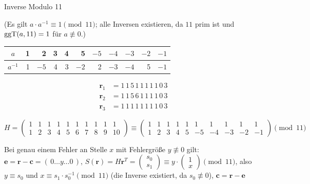 \begin{loesung}
Inverse Modulo 11
\begin{center}
(Es gilt $a \cdot a^{-1} \equiv 1 \pmod{11}$; alle Inversen existieren, da $11$ prim ist und $\operatorname{ggT}(a, 11) = 1$ für $a \not\equiv 0$.)
\begin{tabular}{c|rrrrrrrrrr}
$a$      & 1 & 2  & 3 & 4 & 5  & $-5$ & $-4$ & $-3$ & $-2$ & $-1$\\
\midrule
$a^{-1}$ & 1 & $-5$ & 4 & 3 & $-2$ & 2 & $-3$ & $-4$ & 5 & $-1$\\
\end{tabular}
\end{center}

\begin{align*}
\mathbf{r}_1 &= 1\,1\,5\,1\,1\,1\,1\,1\,0\,3\\
\mathbf{r}_2 &= 1\,1\,5\,6\,1\,1\,1\,1\,0\,3\\
\mathbf{r}_3 &= 1\,1\,1\,1\,1\,1\,1\,1\,0\,3
\end{align*}

\[
H = \begin{pmatrix}
1 & 1 & 1 & 1 & 1 & 1 & 1 & 1 & 1 & 1\\
1 & 2 & 3 & 4 & 5 & 6 & 7 & 8 & 9 & 10
\end{pmatrix}
\equiv
\begin{pmatrix}
1 & 1 & 1 & 1 & 1 & 1 & 1 & 1 & 1 & 1\\
1 & 2 & 3 & 4 & 5 & -5 & -4 & -3 & -2 & -1
\end{pmatrix}
\pmod{11}
\]

Bei genau einem Fehler an Stelle $x$ mit Fehlergröße $y \not\equiv 0$ gilt:
$\mathbf{e} = \mathbf{r} - \mathbf{c} = (\,0 \dots y \dots 0\,)$, \quad
$S(\mathbf{r}) = H\mathbf{r}^T = \begin{pmatrix} s_0\\ s_1 \end{pmatrix} \equiv y \cdot \begin{pmatrix} 1\\ x \end{pmatrix} \pmod{11}$, \quad
also $y \equiv s_0$ und $x \equiv s_1 \cdot s_0^{-1} \pmod{11}$ (die Inverse existiert, da $s_0 \not\equiv 0$), \quad
$\mathbf{c} = \mathbf{r} - \mathbf{e}$


\end{loesung}
